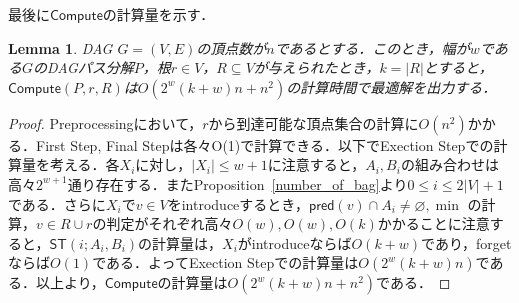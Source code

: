 \documentclass[master]{kuisthesis}		%
\theoremstyle{plain}
\newtheorem{lemma}{Lemma}
\theoremstyle{definition}
\begin{document}

最後に$\mathsf{Compute}$の計算量を示す．

\begin{lemma}
    DAG $G = (V, E)$の頂点数が$n$であるとする．このとき，幅が$w$である$G$のDAGパス分解$P$，根$r \in V$，$R \subseteq V$が与えられたとき，$k = |R|$とすると，$\mathsf{Compute}(P, r, R)$は$O(2^w(k+w)n + n^2)$の計算時間で最適解を出力する．
\end{lemma}

\begin{proof}
    Preprocessingにおいて，$r$から到達可能な頂点集合の計算に$O(n^2)$かかる．First Step, Final Stepは各々O(1)で計算できる．以下でExection Stepでの計算量を考える．各$X_i$に対し，$|X_i| \leq w + 1$に注意すると，$A_i, B_i$の組み合わせは高々$2^{w+1}$通り存在する．またProposition~\ref{number_of_bag}より$0 \leq i \leq 2|V|+1$である．さらに$X_i$で$v \in V$をintroduceするとき，$\mathsf{pred}(v) \cap A_i \neq \varnothing, \min$ の計算，$v \in R \cup {r}$の判定がそれぞれ高々$O(w), O(w), O(k)$かかることに注意すると，$\mathsf{ST}(i; A_i, B_i)$の計算量は，$X_i$がintroduceならば$O(k+w)$であり，forgetならば$O(1)$である．よってExection Stepでの計算量は$O(2^w(k+w)n)$である．以上より，$\mathsf{Compute}$の計算量は$O(2^w(k+w)n + n^2)$である．
\end{proof}
\end{document}
